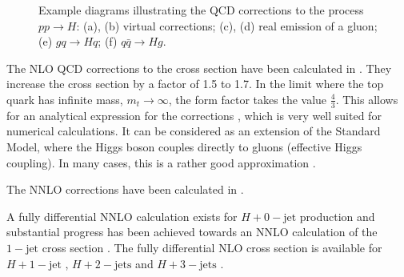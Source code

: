 \begin{figure}
\begin{subfigure}[]{0.3\textwidth}
	\caption{}
\end{subfigure}
\caption{Example diagrams illustrating the QCD corrections to the process $pp \rightarrow H$:
		(a), (b) virtual corrections; (c), (d) real emission of a gluon; (e) $gq \rightarrow Hq$; (f) $q \bar q \rightarrow Hg$.}
\label{fig:ggh_corrections}
\end{figure}
%

The NLO QCD corrections to the cross section have been calculated in \cite{gfusionnlo1}.
They increase the cross section by a factor of \num{1.5} to \num{1.7}.
In the limit where the top quark has infinite mass, $m_t \rightarrow \infty$, the form factor takes the value $\frac{4}{3}$.
This allows for an analytical expression for the corrections \cite{gfusionnlo2}, which is very well suited for numerical calculations.
It can be considered as an extension of the Standard Model, where the Higgs boson couples directly to gluons (effective Higgs coupling).
In many cases, this is a rather good approximation \cite{symmetrybreaking1}.

The NNLO corrections have been calculated in \cite{gfusionnnlo1, gfusionnnlo2}.


A fully differential NNLO calculation exists for $H + 0-\text{jet}$ production \cite{ggh_nnlo_fullydiff_1,ggh_nnlo_fullydiff_2} and substantial progress has been achieved towards an NNLO calculation of the $1-\text{jet}$ cross section \cite{gghj_nnlo_progress}.
The fully differential NLO cross section is available for $H + 1-\text{jet}$ \cite{gghj_nlo_fullydiff_1,gghj_nlo_fullydiff_2}, $H + 2-\text{jets}$ \cite{gghjj_nlo_fullydiff_1,gghjj_nlo_fullydiff_2} and $H + 3-\text{jets}$ \cite{gghjjj_nlo_fullydiff}.



